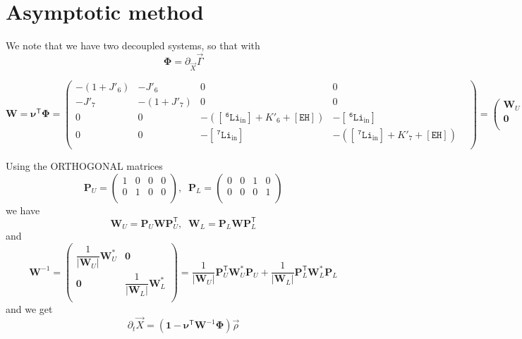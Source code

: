 \documentclass[aps,onecolumn,11pt]{revtex4}
\newcommand{\mychem}[1]{\mathtt{#1}}
\newcommand{\myconc}[1]{\left\lbrack{#1}\right\rbrack}
\newcommand{\spLi}[1]{{~^{\mychem{#1}}\mychem{Li}}}
\newcommand{\spLiIn}[1]{{\spLi{#1}}_{\mathrm{in}}}
\newcommand{\LiIn}[1]{\myconc{\spLiIn{#1}}}
\newcommand{\spEHin}{\mychem{EH}}
\newcommand{\EHin}{\myconc{\spEHin}}
\newcommand{\mytrn}[1]{{#1}^{\!\mathsf{T}}}
\newcommand{\mymat}[1]{{\bm{#1}}}
\newcommand{\mydet}[1]{{\left|{#1}\right|}}
\begin{document}
\section{Asymptotic method}
We note that we have two decoupled systems,
so that with
\begin{equation}
	\mymat{\Phi} = \partial_{\vec{X}} \vec{\Gamma}
\end{equation}

\begin{equation}
\mymat{W} = \mytrn{\mymat{\nu}} \mymat{\Phi} = 
\begin{pmatrix}
	-(1+J'_6) & -J'_6 & 0 & 0\\
	-J'_7 & -(1+J'_7) & 0 & 0\\
	0 & 0 & -(\LiIn{6}+K'_6+\EHin) & -\LiIn{6}\\
	0 & 0 & -\LiIn{7} & -(\LiIn{7}+K'_7+\EHin) & \\
\end{pmatrix}
= \begin{pmatrix}
\mymat{W}_U & \mymat{0}\\
\mymat{0} & \mymat{W}_L\\
\end{pmatrix}
\end{equation}

Using the ORTHOGONAL matrices
\begin{equation}
\mymat{P}_U = 
\begin{pmatrix}
1 & 0 & 0 & 0\\
0 & 1 & 0 & 0\\
\end{pmatrix},\;\;
\mymat{P}_L = 
\begin{pmatrix}
0 & 0 & 1 & 0\\
0 & 0 & 0 & 1\\
\end{pmatrix}
\end{equation}
we have
\begin{equation}
\mymat{W}_U = \mymat{P}_U \mymat{W} \mytrn{\mymat{P}}_U, \;\;
\mymat{W}_L = \mymat{P}_L \mymat{W} \mytrn{\mymat{P}}_L
\end{equation}
and
\begin{equation}
\mymat{W}^{-1} = 
\begin{pmatrix}
\dfrac{1}{\mydet{\mymat{W}_U}} \mymat{W}_U^\ast & \mymat{0} \\
\mymat{0} & \dfrac{1}{\mydet{\mymat{W}_L}} \mymat{W}_L^\ast \\
\end{pmatrix}
=
\dfrac{1}{\mydet{\mymat{W}_U}} \mytrn{\mymat{P}}_U \mymat{W}_U^\ast \mymat{P}_U
+
\dfrac{1}{\mydet{\mymat{W}_L}} \mytrn{\mymat{P}}_L \mymat{W}_L^\ast \mymat{P}_L
\end{equation}
and we get
\begin{equation}
\partial_t \vec{X} = \left(\mymat{1} - \mytrn{\mymat{\nu}} \mymat{W}^{-1} \mymat{\Phi} \right) \vec{\rho}
\end{equation}
\end{document}
